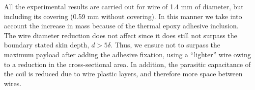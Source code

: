 All the experimental results are carried out for wire of 1.4 mm of diameter, but including its covering (0.59 mm without covering). In this manner we take into account the increase in mass because of the thermal epoxy adhesive inclusion. The wire diameter reduction does not affect since it does still not surpass the boundary stated skin depth, $d>5\delta$. Thus, we ensure not to surpass the maximum payload after adding the adhesive fixation, using a ``lighter'' wire owing to a reduction in the cross-sectional area. In addition, the parasitic capacitance of the coil is reduced due to wire plastic layers, and therefore more space between wires.



